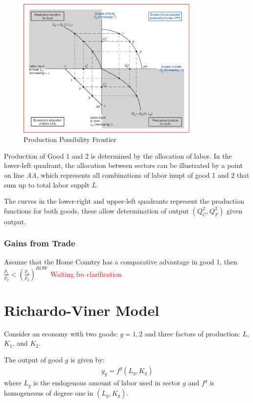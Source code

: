 \begin{figure}[htbp!]
    \centering
    \includegraphics[width=0.8\textwidth]{figures/SFM_PPF.png}
    \caption{Production Possibility Frontier}
    \label{fig:lec4-1}
\end{figure}


Production of Good 1 and 2 is determined by the allocation of labor.
In the lower-left quadrant, the allocation between sectors can be illustrated by a point on line \textit{AA},
which represents all combinations of labor inupt of good 1 and 2 that sum up to total labor supplt $L$.

The curves in the lower-right and upper-left quadrants represent the production functions for both goods,
these allow determination of output $(Q_C^2, Q_F^2)$ given output.

\subsubsection{Gains from Trade}
Assume that the Home Country has a comparative advantage in good 1,
then $\frac{p_1}{p_2} < \left(\frac{p_1}{p_2}\right)^{ROW}$
\textcolor{red}{Waiting fro clarification}


\section{Richardo-Viner Model}
\label{sec:richardo-viner-model}

Consider an economy with two goods: $g=1,2$ and three factors of production: $L$, $K_1$, and $K_2$.

The output of good $g$ is given by:
\begin{gather*}
    y_g = f^g(L_g, K_g)
\end{gather*}
where $L_g$ is the endogenous amount of labor used in sector $g$ and $f^g$ is homogeneous of degree one in $(L_g, K_g)$.

